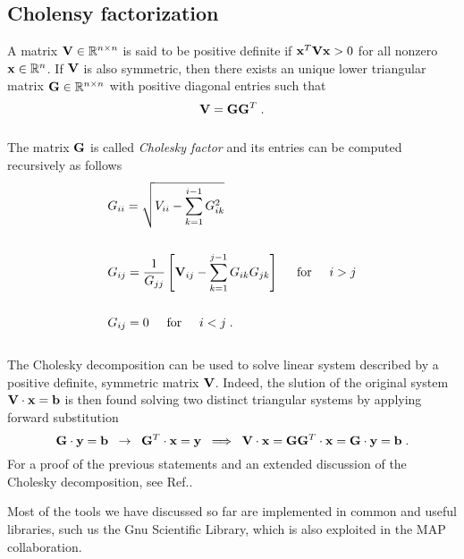 \subsection{Cholensy factorization}
A matrix $\mathbf{V}\in \mathbb{R}^{n \times n}$ is said to be positive definite if $\mathbf{x}^T \mathbf{V} \mathbf{x} > 0$ for all nonzero $\mathbf{x} \in \mathbb{R}^{n}$. If $\mathbf{V}$ is also symmetric, then there exists an unique lower triangular matrix $\mathbf{G} \in \mathbb{R}^{n \times n}$ with positive diagonal entries such that
\\
\begin{equation*}
    \mathbf{V} = \mathbf{G} \mathbf{G}^T \;.
\end{equation*}
\\
The matrix $\mathbf{G}$ is called \textit{Cholesky factor} and its entries can be computed recursively as follows
\\
\begin{align*}
    &G_{ii} = \sqrt{V_{ii} - \sum_{k=1}^{i-1} G_{ik}^2}\\\\
    & G_{ij} = \frac{1}{G_{jj}} \left[ \mathbf{V}_{ij} - \sum_{k=1}^{j-1} G_{ik} G_{jk}\right] \hspace{5mm} \textrm{for} \hspace{5mm} i>j\\\\
    &G_{ij} = 0 \hspace{5mm} \textrm{for} \hspace{5mm} i<j \; .
\end{align*}
\\
The Cholesky decomposition can be used to solve linear system described by a positive definite, symmetric matrix $\mathbf{V}$. Indeed, the slution of the original system $\mathbf{V} \cdot \mathbf{x} = \mathbf{b}$ is then found solving two distinct triangular systems by applying forward substitution
\\
\begin{equation*}
    \mathbf{G}\cdot \mathbf{y} = \mathbf{b} \; \; \rightarrow \; \;  \mathbf{G}^{T}\cdot \mathbf{x} = \mathbf{y} \; \; \Longrightarrow \; \; \mathbf{V} \cdot\mathbf{x} = \mathbf{G} \mathbf{G}^T \cdot \mathbf{x} = \mathbf{G} \cdot \mathbf{y} = \mathbf{b}\; .
\end{equation*}
For a proof of the previous statements and an extended discussion of the Cholesky decomposition, see Ref.\cite{GoluVanl96}.\par
Most of the tools we have discussed so far are implemented in common and useful libraries, such us the Gnu Scientific Library, which is also exploited in the MAP collaboration.